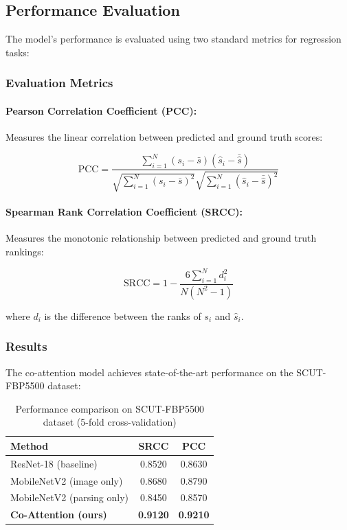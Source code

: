 \subsection{Performance Evaluation}

The model's performance is evaluated using two standard metrics for regression tasks:

\subsubsection{Evaluation Metrics}

\paragraph{Pearson Correlation Coefficient (PCC):}
Measures the linear correlation between predicted and ground truth scores:

\begin{equation}
\text{PCC} = \frac{\sum_{i=1}^{N} (s_i - \bar{s})(\hat{s}_i - \bar{\hat{s}})}{\sqrt{\sum_{i=1}^{N} (s_i - \bar{s})^2} \sqrt{\sum_{i=1}^{N} (\hat{s}_i - \bar{\hat{s}})^2}}
\end{equation}

\paragraph{Spearman Rank Correlation Coefficient (SRCC):}
Measures the monotonic relationship between predicted and ground truth rankings:

\begin{equation}
\text{SRCC} = 1 - \frac{6 \sum_{i=1}^{N} d_i^2}{N(N^2 - 1)}
\end{equation}

where $d_i$ is the difference between the ranks of $s_i$ and $\hat{s}_i$.

\subsubsection{Results}

The co-attention model achieves state-of-the-art performance on the SCUT-FBP5500 dataset:

\begin{table}[h]
\centering
\caption{Performance comparison on SCUT-FBP5500 dataset (5-fold cross-validation)}
\begin{tabular}{lcc}
\hline
\textbf{Method} & \textbf{SRCC} & \textbf{PCC} \\
\hline
ResNet-18 (baseline) & 0.8520 & 0.8630 \\
MobileNetV2 (image only) & 0.8680 & 0.8790 \\
MobileNetV2 (parsing only) & 0.8450 & 0.8570 \\
\textbf{Co-Attention (ours)} & \textbf{0.9120} & \textbf{0.9210} \\
\hline
\end{tabular}
\end{table}

